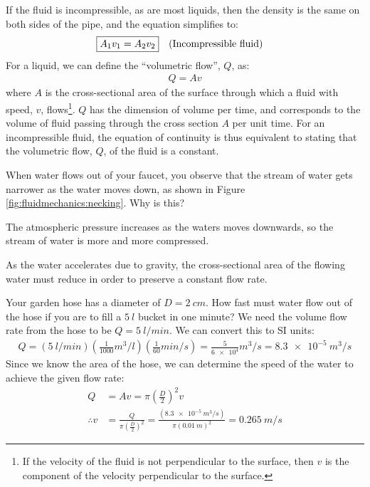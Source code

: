 {{If the fluid is incompressible, as are most liquids, then the density is the same on both sides of the pipe, and the equation simplifies to:
\begin{align}
\Aboxed{A_1 v_1 &= A_2 v_2}\quad\text{(Incompressible fluid)}
\end{align}
For a liquid, we can define the ``volumetric flow'', $Q$, as:
\begin{align*}
Q=Av
\end{align*}
where $A$ is the cross-sectional area of the surface through which a fluid with speed, $v$, flows\footnote{If the velocity of the fluid is not perpendicular to the surface, then $v$ is the component of the velocity perpendicular to the surface.}. $Q$ has the dimension of volume per time, and corresponds to the volume of fluid passing through the cross section $A$ per unit time. For an incompressible fluid, the equation of continuity is thus equivalent to stating that the volumetric flow, $Q$, of the fluid is a constant. 

\begin{checkpoint}
\begin{MCquestion}{When water flows out of your faucet, you observe that the stream of water gets narrower as the water moves down, as shown in Figure \ref{fig:fluidmechanics:necking}. Why is this?}
\item The atmospheric pressure increases as the waters moves downwards, so the stream of water is more and more compressed.
\item As the water accelerates due to gravity, the cross-sectional area of the flowing water must reduce in order to preserve a constant flow rate. \correct    
\end{MCquestion}
\end{checkpoint}

\begin{example}{Your garden hose has a diameter of $D=\SI{2}{cm}$. How fast must water flow out of the hose if you are to fill a $\SI{5}{l}$ bucket in one minute?}
We need the volume flow rate from the hose to be $Q=\SI{5}{l/min}$. We can convert this to SI units:
\begin{align*}
Q=(\SI{5}{l/min})\left(\frac{1}{1000}\si{m^3/l}\right) \left(\frac{1}{60}\si{min/s}\right)=\frac{5}{\num{6e4}}\si{m^3/s}=\SI{8.3e-5}{m^3/s}
\end{align*}
Since we know the area of the hose, we can determine the speed of the water to achieve the given flow rate:
\begin{align*}
Q &= Av=\pi \left(\frac{D}{2}\right)^2v \\
\therefore v&=\frac{Q}{\pi \left(\frac{D}{2}\right)^2}=\frac{(\SI{8.3e-5}{m^3/s})}{\pi(\SI{0.01}{m})^2}=\SI{0.265}{m/s}
\end{align*}
\end{example}


}}
